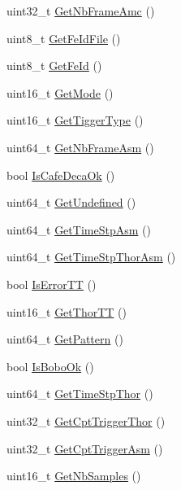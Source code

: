 \begin{DoxyCompactItemize}
\item 
uint32\+\_\+t \hyperlink{classDecodeFrame_a443f66af9144baf11fa5d5cd9c358729}{Get\+Nb\+Frame\+Amc} ()
\item 
uint8\+\_\+t \hyperlink{classDecodeFrame_a0e408e31eabbebea698d4f3122b79427}{Get\+Fe\+Id\+File} ()
\item 
uint8\+\_\+t \hyperlink{classDecodeFrame_a27a2218fdc331c7c4afb1b57c103edac}{Get\+Fe\+Id} ()
\item 
uint16\+\_\+t \hyperlink{classDecodeFrame_a0bb520a314a74665a0092dbbf0f32310}{Get\+Mode} ()
\item 
uint16\+\_\+t \hyperlink{classDecodeFrame_a4bd099178e4f7a067dac451d2cb844b2}{Get\+Tigger\+Type} ()
\item 
uint64\+\_\+t \hyperlink{classDecodeFrame_affbc2d0f3774cb4fff34b42c446a5955}{Get\+Nb\+Frame\+Asm} ()
\item 
bool \hyperlink{classDecodeFrame_a6dfe57ddaf11b02fd88c2edcc98091f3}{Is\+Cafe\+Deca\+Ok} ()
\item 
uint64\+\_\+t \hyperlink{classDecodeFrame_a77f130ef36c084573decb71523cb74a1}{Get\+Undefined} ()
\item 
uint64\+\_\+t \hyperlink{classDecodeFrame_a8ceda592a6bd4ed68faaeeda53b433a0}{Get\+Time\+Stp\+Asm} ()
\item 
uint64\+\_\+t \hyperlink{classDecodeFrame_a69475a7cd412ac056bc97f16768b470b}{Get\+Time\+Stp\+Thor\+Asm} ()
\item 
bool \hyperlink{classDecodeFrame_af055529f670b6be84708fce56e5cd0cd}{Is\+Error\+TT} ()
\item 
uint16\+\_\+t \hyperlink{classDecodeFrame_a5fafd547d67ae2f38635174a402b5824}{Get\+Thor\+TT} ()
\item 
uint64\+\_\+t \hyperlink{classDecodeFrame_a036d1c2974dc06c43ee945b7586a14d6}{Get\+Pattern} ()
\item 
bool \hyperlink{classDecodeFrame_a0161fec474851adebcb4494c8773242e}{Is\+Bobo\+Ok} ()
\item 
uint64\+\_\+t \hyperlink{classDecodeFrame_a81f93958ad2e294cb165ca1fda16e6d5}{Get\+Time\+Stp\+Thor} ()
\item 
uint32\+\_\+t \hyperlink{classDecodeFrame_a582eb89fe03a3076f394776330a6c037}{Get\+Cpt\+Trigger\+Thor} ()
\item 
uint32\+\_\+t \hyperlink{classDecodeFrame_ab9c8da95989c9d1d3cb7bb28d2ac5811}{Get\+Cpt\+Trigger\+Asm} ()
\item 
uint16\+\_\+t \hyperlink{classDecodeFrame_a97752547e2e402603dccf279928cd347}{Get\+Nb\+Samples} ()
\item 

\end{DoxyCompactItemize}
